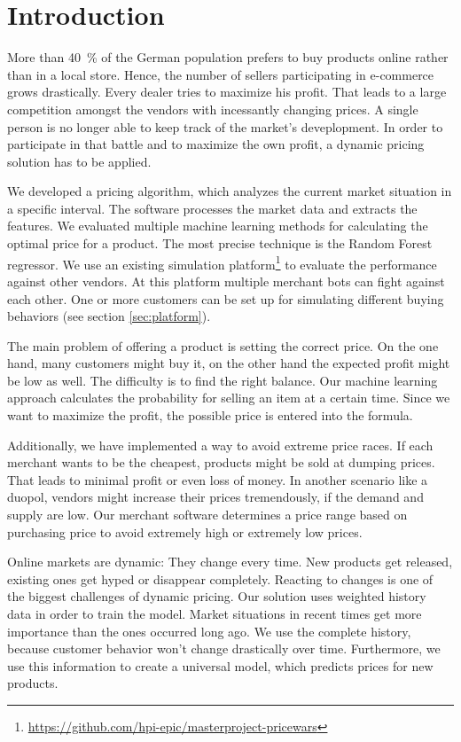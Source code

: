 \section{Introduction}
More than 40~\% of the German population prefers to buy products online rather than in a local store. \cite{shoppingStatistic} Hence, the number of sellers participating in e-commerce grows drastically. Every dealer tries to maximize his profit. That leads to a large competition amongst the vendors with incessantly changing prices. A single person is no longer able to keep track of the market's deveplopment. In order to participate in that battle and to maximize the own profit, a dynamic pricing solution has to be applied.

We developed a pricing algorithm, which analyzes the current market situation in a specific interval. The software processes the market data and extracts the features. We evaluated multiple machine learning methods for calculating the optimal price for a product. The most precise technique is the Random Forest regressor. We use an existing simulation platform\footnote{\href{https://github.com/hpi-epic/masterproject-pricewars}{https://github.com/hpi-epic/masterproject-pricewars}} to evaluate the performance against other vendors. At this platform multiple merchant bots can fight against each other. One or more customers can be set up for simulating different buying behaviors (see section \ref{sec:platform}).

The main problem of offering a product is setting the correct price. On the one hand, many customers might buy it, on the other hand the expected profit might be low as well. The difficulty is to find the right balance. Our machine learning approach calculates the probability for selling an item at a certain time. Since we want to maximize the profit, the possible price is entered into the formula.

Additionally, we have implemented a way to avoid extreme price races. If each merchant wants to be the cheapest, products might be sold at dumping prices. That leads to minimal profit or even loss of money. In another scenario like a duopol, vendors might increase their prices tremendously, if the demand and supply are low. Our merchant software determines a price range based on purchasing price to avoid extremely high or extremely low prices.

Online markets are dynamic: They change every time. New products get released, existing ones get hyped or disappear completely. Reacting to changes is one of the biggest challenges of dynamic pricing. Our solution uses weighted history data in order to train the model. Market situations in recent times get more importance than the ones occurred long ago. We use the complete history, because customer behavior won't change drastically over time. Furthermore, we use this information to create a universal model, which predicts prices for new products.

